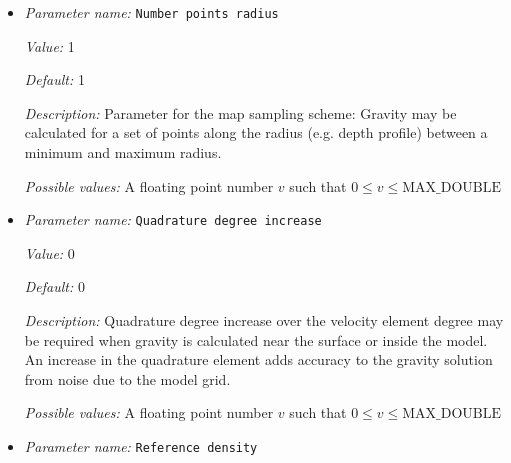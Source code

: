 \begin{itemize}
{\it Value:} 1


{\it Default:} 1


{\it Description:} Parameter for the map sampling scheme: Gravity may be calculated for a sets of points along the longitude (e.g. gravity map) between a minimum and maximum longitude.


{\it Possible values:} A floating point number $v$ such that $0 \leq v \leq \text{MAX\_DOUBLE}$
\item {\it Parameter name:} {\tt Number points radius}
\label{parameters:Postprocess/Gravity calculation/Number points radius}
\label{parameters:Postprocess/Gravity_20calculation/Number_20points_20radius}


{\it Value:} 1


{\it Default:} 1


{\it Description:} Parameter for the map sampling scheme: Gravity may be calculated for a set of points along the radius (e.g. depth profile) between a minimum and maximum radius.


{\it Possible values:} A floating point number $v$ such that $0 \leq v \leq \text{MAX\_DOUBLE}$
\item {\it Parameter name:} {\tt Quadrature degree increase}
\label{parameters:Postprocess/Gravity calculation/Quadrature degree increase}
\label{parameters:Postprocess/Gravity_20calculation/Quadrature_20degree_20increase}


{\it Value:} 0


{\it Default:} 0


{\it Description:} Quadrature degree increase over the velocity element degree may be required when gravity is calculated near the surface or inside the model. An increase in the quadrature element adds accuracy to the gravity solution from noise due to the model grid.


{\it Possible values:} A floating point number $v$ such that $0 \leq v \leq \text{MAX\_DOUBLE}$
\item {\it Parameter name:} {\tt Reference density}
\label{parameters:Postprocess/Gravity calculation/Reference density}
\label{parameters:Postprocess/Gravity_20calculation/Reference_20density}



\end{itemize}
